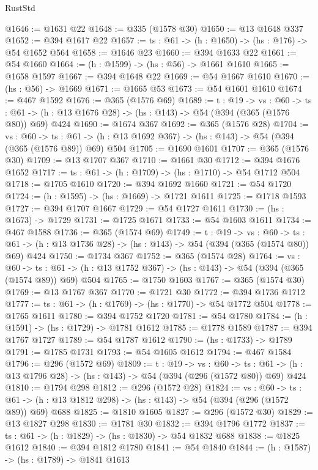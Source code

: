 \begin{lexlean}{RustStd}
\begin{coremodule}
@1646 := @1631 @22
@1648 := @335 (@1578 @30)
@1650 := @13 @1648 @337
@1652 := @394 @1617 @22
@1657 := {ts : @61} -> (h : @1650) -> (hs : @176) -> @54 @1652 @564
@1658 := @1646 @23
@1660 := @394 @1633 @22
@1661 := @54 @1660
@1664 := (h : @1599) -> (hs : @56) -> @1661 @1610
@1665 := @1658 @1597
@1667 := @394 @1648 @22
@1669 := @54 @1667 @1610
@1670 := (hs : @56) -> @1669
@1671 := @1665 @53
@1673 := @54 @1601 @1610
@1674 := @467 @1592
@1676 := @365 (@1576 @69)
@1689 := {t : @19} ->
  {vs : @60} ->
  {ts : @61} -> (h : @13 @1676 @28) -> (hs : @143) -> @54 (@394 (@365 (@1576 @80)) @69) @424
@1690 := @1674 @367
@1692 := @365 (@1576 @28)
@1704 := {vs : @60} ->
  {ts : @61} -> (h : @13 @1692 @367) -> (hs : @143) -> @54 (@394 (@365 (@1576 @89)) @69) @504
@1705 := @1690 @1601
@1707 := @365 (@1576 @30)
@1709 := @13 @1707 @367
@1710 := @1661 @30
@1712 := @394 @1676 @1652
@1717 := {ts : @61} -> (h : @1709) -> (hs : @1710) -> @54 @1712 @504
@1718 := @1705 @1610
@1720 := @394 @1692 @1660
@1721 := @54 @1720
@1724 := (h : @1595) -> (hs : @1669) -> @1721 @1611
@1725 := @1718 @1593
@1727 := @394 @1707 @1667
@1729 := @54 @1727 @1611
@1730 := (hs : @1673) -> @1729
@1731 := @1725 @1671
@1733 := @54 @1603 @1611
@1734 := @467 @1588
@1736 := @365 (@1574 @69)
@1749 := {t : @19} ->
  {vs : @60} ->
  {ts : @61} -> (h : @13 @1736 @28) -> (hs : @143) -> @54 (@394 (@365 (@1574 @80)) @69) @424
@1750 := @1734 @367
@1752 := @365 (@1574 @28)
@1764 := {vs : @60} ->
  {ts : @61} -> (h : @13 @1752 @367) -> (hs : @143) -> @54 (@394 (@365 (@1574 @89)) @69) @504
@1765 := @1750 @1603
@1767 := @365 (@1574 @30)
@1769 := @13 @1767 @367
@1770 := @1721 @30
@1772 := @394 @1736 @1712
@1777 := {ts : @61} -> (h : @1769) -> (hs : @1770) -> @54 @1772 @504
@1778 := @1765 @1611
@1780 := @394 @1752 @1720
@1781 := @54 @1780
@1784 := (h : @1591) -> (hs : @1729) -> @1781 @1612
@1785 := @1778 @1589
@1787 := @394 @1767 @1727
@1789 := @54 @1787 @1612
@1790 := (hs : @1733) -> @1789
@1791 := @1785 @1731
@1793 := @54 @1605 @1612
@1794 := @467 @1584
@1796 := @296 (@1572 @69)
@1809 := {t : @19} ->
  {vs : @60} ->
  {ts : @61} -> (h : @13 @1796 @28) -> (hs : @143) -> @54 (@394 (@296 (@1572 @80)) @69) @424
@1810 := @1794 @298
@1812 := @296 (@1572 @28)
@1824 := {vs : @60} ->
  {ts : @61} -> (h : @13 @1812 @298) -> (hs : @143) -> @54 (@394 (@296 (@1572 @89)) @69) @688
@1825 := @1810 @1605
@1827 := @296 (@1572 @30)
@1829 := @13 @1827 @298
@1830 := @1781 @30
@1832 := @394 @1796 @1772
@1837 := {ts : @61} -> (h : @1829) -> (hs : @1830) -> @54 @1832 @688
@1838 := @1825 @1612
@1840 := @394 @1812 @1780
@1841 := @54 @1840
@1844 := (h : @1587) -> (hs : @1789) -> @1841 @1613

\end{coremodule}
\end{lexlean}
